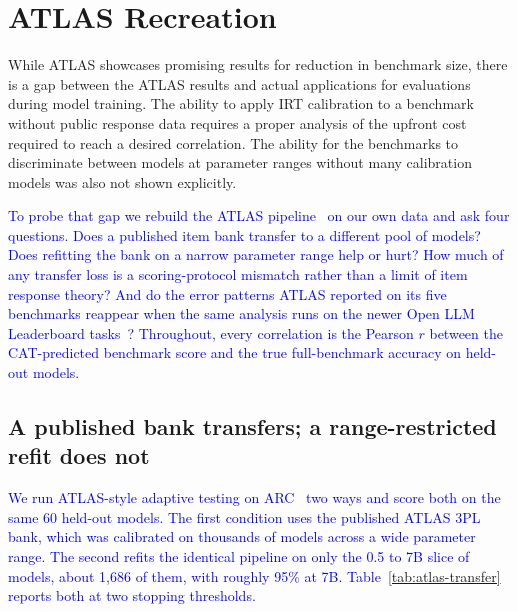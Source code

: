 \providecommand{\aiadd}[1]{\textcolor{blue}{#1}}
\providecommand{\aibullets}[1]{{\color{blue}#1}}

\section{ATLAS Recreation}
\label{sec:mcq-atlas-recreation}

While ATLAS showcases promising results for reduction in benchmark size, there is
a gap between the ATLAS results and actual applications for evaluations during
model training. The ability to apply IRT calibration to a benchmark without public
response data requires a proper analysis of the upfront cost required to reach a
desired correlation. The ability for the benchmarks to discriminate between models
at parameter ranges without many calibration models was also not shown explicitly.

\aiadd{To probe that gap we rebuild the ATLAS pipeline~\cite{li2025atlas} on
our own data and ask four questions. Does a published item bank transfer to a
different pool of models? Does refitting the bank on a narrow parameter range help
or hurt? How much of any transfer loss is a scoring-protocol mismatch rather than
a limit of item response theory? And do the error patterns ATLAS reported on its
five benchmarks reappear when the same analysis runs on the newer Open LLM
Leaderboard tasks~\cite{fourrier2024openllm}? Throughout, every correlation is the
Pearson $r$ between the CAT-predicted benchmark score and the true full-benchmark
accuracy on held-out models.}

\subsection{A published bank transfers; a range-restricted refit does not}
\label{subsec:atlas-transfer}

\aiadd{We run ATLAS-style adaptive testing on ARC~\cite{clark2018arc} two ways and
score both on the same 60 held-out models. The first condition uses the published
ATLAS 3PL bank, which was calibrated on thousands of models across a wide parameter
range. The second refits the identical pipeline on only the 0.5 to 7B slice of
models, about 1{,}686 of them, with roughly 95\% at 7B. Table~\ref{tab:atlas-transfer}
reports both at two stopping thresholds.}

